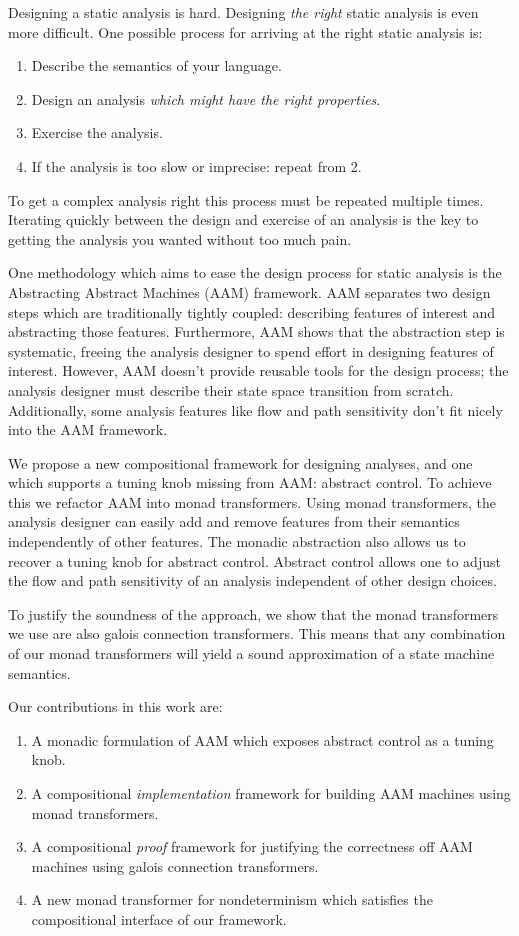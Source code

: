 \documentclass{article}
\begin{document}
Designing a static analysis is hard.
Designing \emph{the right} static analysis is even more difficult.
One possible process for arriving at the right static analysis is:
\begin{enumerate}
\item Describe the semantics of your language.
\item Design an analysis \emph{which might have the right properties}.
\item Exercise the analysis.
\item If the analysis is too slow or imprecise: repeat from 2.
\end{enumerate}
To get a complex analysis right this process must be repeated multiple times.
Iterating quickly between the design and exercise of an analysis is the key to getting the analysis you wanted without too much pain.

One methodology which aims to ease the design process for static analysis is the Abstracting Abstract Machines (AAM) framework\cite{AAM}.
AAM separates two design steps which are traditionally tightly coupled: describing features of interest and abstracting those features.
Furthermore, AAM shows that the abstraction step is systematic, freeing the analysis designer to spend effort in designing features of interest.
However, AAM doesn't provide reusable tools for the design process; the analysis designer must describe their state space transition from scratch.
Additionally, some analysis features like flow and path sensitivity don't fit nicely into the AAM framework.

We propose a new compositional framework for designing analyses, and one which supports a tuning knob missing from AAM: abstract control.
To achieve this we refactor AAM into monad transformers.
Using monad transformers, the analysis designer can easily add and remove features from their semantics independently of other features.
The monadic abstraction also allows us to recover a tuning knob for abstract control.
Abstract control allows one to adjust the flow and path sensitivity of an analysis independent of other design choices.

To justify the soundness of the approach, we show that the monad transformers we use are also galois connection transformers.
This means that any combination of our monad transformers will yield a sound approximation of a state machine semantics.

Our contributions in this work are:
\begin{enumerate}
\item A monadic formulation of AAM which exposes abstract control as a tuning knob.
\item A compositional \emph{implementation} framework for building AAM machines using monad transformers.
\item A compositional \emph{proof} framework for justifying the correctness off AAM machines using galois connection transformers.
\item A new monad transformer for nondeterminism which satisfies the compositional interface of our framework.
\end{enumerate}
\end{document}
